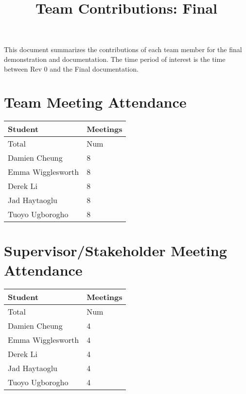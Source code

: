 \documentclass{article}
\title{Team Contributions: Final\\\progname}
\author{\authname}
\date{}
\begin{document}
\maketitle

This document summarizes the contributions of each team member for the final
demonstration and documentation.  The time period of interest is the time
between Rev 0 and the Final documentation.

\section{Team Meeting Attendance}

\begin{table}[H]
\centering
\begin{tabular}{ll}
\toprule
\textbf{Student} & \textbf{Meetings}\\
\midrule
Total & Num\\
Damien Cheung & 8\\
Emma Wigglesworth & 8\\
Derek Li & 8\\
Jad Haytaoglu & 8\\
Tuoyo Ugborogho & 8\\
\bottomrule
\end{tabular}
\end{table}


\section{Supervisor/Stakeholder Meeting Attendance}

\begin{table}[H]
\centering
\begin{tabular}{ll}
\toprule
\textbf{Student} & \textbf{Meetings}\\
\midrule
Total & Num\\
Damien Cheung & 4\\
Emma Wigglesworth & 4\\
Derek Li & 4\\
Jad Haytaoglu & 4\\
Tuoyo Ugborogho & 4\\
\bottomrule
\end{tabular}
\end{table}

\end{document}
